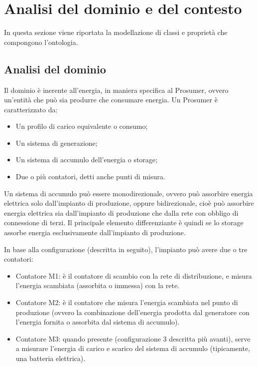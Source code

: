 \chapter{Analisi del dominio e del contesto}
In questa sezione viene riportata la modellazione di classi e proprietà che compongono l'ontologia.


\section{Analisi del dominio}
Il dominio è inerente all'energia, in maniera specifica al Prosumer, ovvero un'entità che può sia produrre che consumare energia.
Un Prosumer è caratterizzato da:

\begin{itemize}
    \item Un profilo di carico equivalente o consumo;
    \item Un sistema di generazione;
    \item Un sistema di accumulo dell'energia o storage;
    \item Due o più contatori, detti anche punti di misura.
\end{itemize}

Un sistema di accumulo può essere monodirezionale, ovvero può assorbire energia elettrica solo dall’impianto di produzione, oppure bidirezionale, cioè può assorbire energia elettrica sia dall’impianto di produzione che dalla rete con obbligo di connessione di terzi.
Il principale elemento differenziante è quindi se lo storage assorbe energia esclusivamente dall’impianto di produzione.

In base alla configurazione (descritta in seguito), l'impianto può avere due o tre contatori:
\begin{itemize}
    \item Contatore M1: è il contatore di scambio con la rete di distribuzione, e misura l’energia scambiata (assorbita o immessa) con la rete.
    \item Contatore M2: è il contatore che misura l’energia scambiata nel punto di produzione (ovvero la combinazione dell’energia prodotta dal generatore con l’energia fornita o assorbita dal sistema di accumulo).
    \item Contatore M3: quando presente (configurazione 3 descritta più avanti), serve a misurare l’energia di carico e scarico del sistema di accumulo (tipicamente, una batteria elettrica).
\end{itemize}

